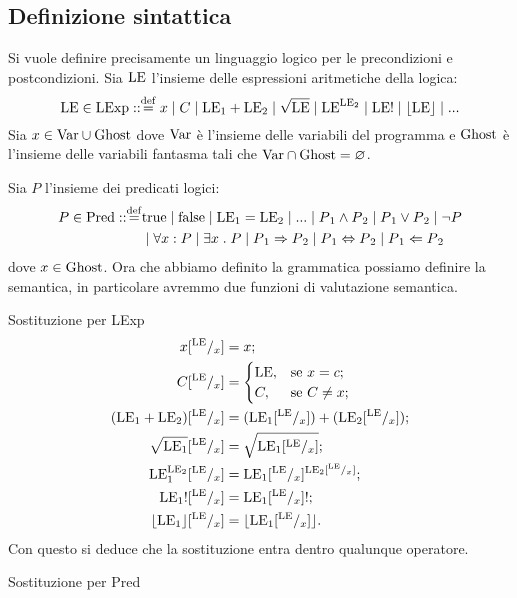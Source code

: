 \subsection{Definizione sintattica}
\theoremstyle{definition}
Si vuole definire precisamente un linguaggio logico per le precondizioni e postcondizioni. Sia $\mathrm{LE}$ l'insieme delle espressioni aritmetiche della logica:
$$\LE \in \LExp \itc\itc\defeq x \mid C \mid \LE{_1} + \LE{_2} \mid \sqrt{\LE} \mid \LE^{\LE{_2}} \mid \LE! \mid \lfloor \LE \rfloor \mid ...$$
Sia $x\in\mathrm{Var}\cup\mathrm{Ghost}$ dove $\mathrm{Var}$ è l'insieme delle variabili del programma e $\mathrm{Ghost}$ è l'insieme delle variabili fantasma tali che $\mathrm{Var}\cap\mathrm{Ghost} = \varnothing$.

Sia $P$ l'insieme dei predicati logici:
\begin{align*}
P \in \Pred \itc\itc\defeq &\true \mid\false\mid\LE{_1} = \LE{_2}\mid ...\mid P{_1} \wedge P{_2} \mid P{_1} \vee P{_2} \mid \neg P\\
&\mid \forall x \itc P\mid \exists x \st P\mid P{_1} \Rightarrow P{_2} \mid P{_1} \Leftrightarrow P{_2} \mid P{_1} \Leftarrow P{_2}
\end{align*}
dove $ x \in\mathrm{Ghost}$. Ora che abbiamo definito la grammatica possiamo definire la semantica, in particolare avremmo due funzioni di valutazione semantica.
\theoremstyle{definition}
Sostituzione per LExp
\begin{align*}
   x [^{\mathrm{LE}}/_ x ]
    &=  x ;\\
   C[^{\mathrm{LE}}/_ x ]
    &=
      \begin{cases}
        \mathrm{LE}, &\text{se $x  =  c$;} \\
        C,   &\text{se $C \neq  x$;}
      \end{cases} \\
  (\mathrm{LE}_1 + \mathrm{LE}_2)[^{\mathrm{LE}}/_ x ] 
     &= (\mathrm{LE}_1[^{\mathrm{LE}}/_x]) + (\mathrm{LE}_2[^{\mathrm{LE}}/_x]);\\
  \sqrt{\mathrm{LE}_1}[^{\mathrm{LE}}/_x] 
     &= \sqrt{{\mathrm{LE}_1}[^{\mathrm{LE}}/_x]};\\
  \mathrm{LE}_1^{\mathrm{LE}{_2}}[^{\mathrm{LE}}/_x] 
     &= \mathrm{LE}_1[^{\mathrm{LE}}/_x]^{\mathrm{LE}{_2}[^{\mathrm{LE}}/_ x ]};\\
  {\mathrm{LE}_1}![^{\mathrm{LE}}/_ x ] 
     &= {{\mathrm{LE}_1}[^{\mathrm{LE}}/_ x ]}!;\\
  \lfloor \mathrm{LE}_1 \rfloor[^{\mathrm{LE}}/_ x] 
     &= \lfloor \mathrm{LE}_1[^{\mathrm{LE}}/_x] \rfloor.\\
\end{align*}
Con questo si deduce che la sostituzione entra dentro qualunque operatore.
\theoremstyle{definition}
Sostituzione per Pred
